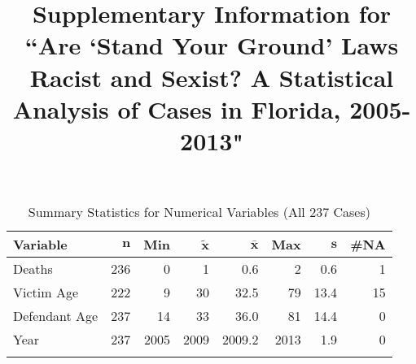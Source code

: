 \documentclass[11pt, oneside]{article}   	%
\title{Supplementary Information for ``Are `Stand Your Ground' Laws Racist and Sexist? A Statistical Analysis of Cases in Florida, 2005-2013"}
\author{}
\date{}							%
\begin{document}
\maketitle

{\footnotesize
\begin{longtable}{lrrrrrrr}
\caption{Summary Statistics for Numerical Variables (All 237 Cases)} \\
 \textbf{Variable} & $\mathbf{n}$ & \textbf{Min} & $\mathbf{\widetilde{x}}$ & $\mathbf{\bar{x}}$ & \textbf{Max} & $\mathbf{s}$ & \textbf{\#NA} \\ 
  \hline
Deaths & 236 &    0 &    1 &    0.6 &    2 &  0.6 &  1 \\ 
  Victim Age & 222 &    9 &   30 &   32.5 &   79 & 13.4 & 15 \\ 
  Defendant Age & 237 &   14 &   33 &   36.0 &   81 & 14.4 &  0 \\ 
   Year & 237 & 2005 & 2009 & 2009.2 & 2013 &  1.9 &  0 \\ 
  \hline
\label{Summary Statistics for Numerical Variables}
\end{longtable}
}

\pagebreak
\end{document}
